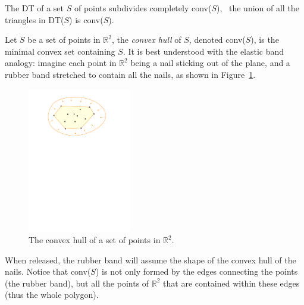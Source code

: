 The DT of a set $S$ of points subdivides completely conv($S$), \ie\ the union of all the triangles in DT($S$) is conv($S$).

Let $S$ be a set of points in $\mathbb{R}^2$, the \emph{convex hull} of $S$, denoted conv($S$), is the minimal convex set containing $S$. 
It is best understood with the elastic band analogy: imagine each point in $\mathbb{R}^2$ being a nail sticking out of the plane, and a rubber band stretched to contain all the nails, as shown in Figure~\ref{fig:convex_hull}. 
\begin{figure}
  \centering
  \includegraphics[width=0.4\textwidth]{figs/convex_hull}
  \caption{The convex hull of a set of points in $\mathbb{R}^2$.} 
\label{fig:convex_hull}
\end{figure}
When released, the rubber band will assume the shape of the convex hull of the nails. 
Notice that conv($S$) is not only formed by the edges connecting the points (the rubber band), but all the points of $\mathbb{R}^2$ that are contained within these edges (thus the whole polygon).


%
